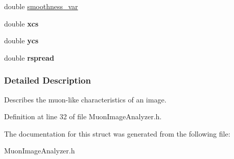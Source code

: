\begin{DoxyCompactItemize}
\item 
\hypertarget{structMuonParameterization_a8787f6467e1d4ffca5bbc1a96c6f64e7}{
double \hyperlink{structMuonParameterization_a8787f6467e1d4ffca5bbc1a96c6f64e7}{smoothness\_\-var}}
\label{structMuonParameterization_a8787f6467e1d4ffca5bbc1a96c6f64e7}

\item 
\hypertarget{structMuonParameterization_a9415f852432d71ea7c2d639d0336a1fc}{
double {\bfseries xcs}}
\label{structMuonParameterization_a9415f852432d71ea7c2d639d0336a1fc}

\item 
\hypertarget{structMuonParameterization_aab3debf8a20b5743eab93e3cc49b7c37}{
double {\bfseries ycs}}
\label{structMuonParameterization_aab3debf8a20b5743eab93e3cc49b7c37}

\item 
\hypertarget{structMuonParameterization_a07067d0d35d7409a7b46ebd3d95a344d}{
double {\bfseries rspread}}
\label{structMuonParameterization_a07067d0d35d7409a7b46ebd3d95a344d}

\end{DoxyCompactItemize}


\subsubsection{Detailed Description}
Describes the muon-\/like characteristics of an image. 

Definition at line 32 of file MuonImageAnalyzer.h.



The documentation for this struct was generated from the following file:\begin{DoxyCompactItemize}
\item 
MuonImageAnalyzer.h\end{DoxyCompactItemize}

